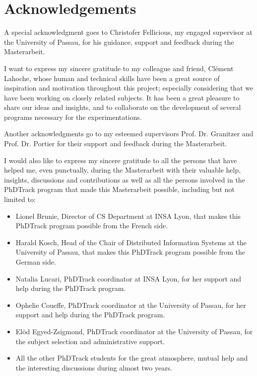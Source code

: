 \documentclass[11pt]{book} %
\begin{document}
\newpage
\section*{Acknowledgements}
A special acknowledgment goes to Christofer Fellicious, my engaged supervisor at the University of Passau, for his guidance, support and feedback during the Masterarbeit. 

I want to express my sincere gratitude to my colleague and friend, Clément Lahoche, whose human and technical skills have been a great source of inspiration and motivation throughout this project;  especially considering that we have been working on closely related subjects. It has been a great pleasure to share our ideas and insights, and to collaborate on the development of several programs necessary for the experimentations. 

Another acknowledgments go to my esteemed supervisors Prof. Dr. Granitzer and Prof. Dr. Portier for their support and feedback during the Masterarbeit. 

I would also like to express my sincere gratitude to all the persons that have helped me, even punctually, during the Masterarbeit with their valuable help, insights, discussions and contributions as well as all the persons involved in the PhDTrack program that made this Masterarbeit possible, including but not limited to: 
\begin{itemize}
    \item Lionel Brunie, Director of CS Department at INSA Lyon, that makes this PhDTrack program possible from the French side.
    \item Harald Kosch, Head of the Chair of Distributed Information Systems at the University of Passau, that makes this PhDTrack program possible from the German side.
    \item Natalia Lucari, PhDTrack coordinator at INSA Lyon, for her support and help during the PhDTrack program.
    \item Ophelie Coueffe, PhDTrack coordinator at the University of Passau, for her support and help during the PhDTrack program.
    \item Elöd Egyed-Zsigmond, PhDTrack coordinator at the University of Passau, for the subject selection and administrative support.
    \item All the other PhDTrack students for the great atmosphere, mutual help and the interesting discussions during almost two years.
\end{itemize}
\end{document}
